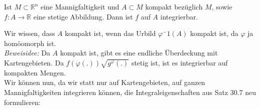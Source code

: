 \begin{satz}
Ist $M\subset\mathbb{R}^n$ eine Mannigfaltigkeit und $A\subset M$ 
kompakt bezüglich $M$, sowie $f:A\rightarrow\mathbb{R}$ eine stetige 
Abbildung. Dann ist $f$ auf $A$ integrierbar.
\end{satz}
Wir wissen, dass $A$ kompakt ist, wenn das Urbild $\varphi^-1(A)$ kompakt 
ist, da $\varphi$ ja homöomorph ist.\\
\emph{Beweisidee:} Da $A$ kompakt ist, gibt es eine endliche 
Überdeckung mit Kartengebieten. Da $f(\varphi(.))\sqrt{g^\varphi(.)}$ 
stetig ist, ist es integrierbar auf kompakten Mengen.\\
\linebreak
Wir können nun, da wir statt nur auf Kartengebieten, auf ganzen 
Mannigfaltigkeiten integrieren können, die Integraleigenschaften 
aus Satz 30.7 neu formulieren:
